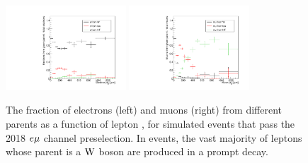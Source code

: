 \begin{figure}
\centering
\includegraphics[width=0.4\textwidth]{figures/bg/emu_tt_electronAbsD0_1000um_variableBins_coarse_ratios.pdf}
\includegraphics[width=0.4\textwidth]{figures/bg/emu_tt_muonAbsD0_1000um_variableBins_coarse_ratios.pdf}
\caption{The fraction of electrons (left) and muons (right) from different parents as a function of lepton \ad, for simulated \ttbar events that pass the 2018 $e{\mu}$ channel preselection. In \ttbar events, the vast majority of leptons whose parent is a $\mathrm{W}$ boson are produced in a prompt decay.}
\label{ttbar_d0_behavior}
\end{figure}